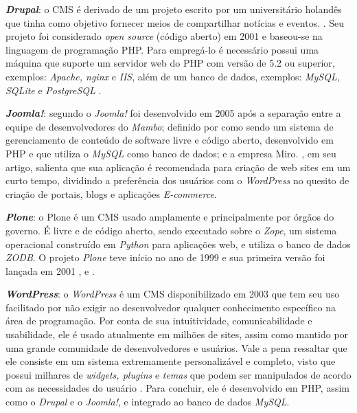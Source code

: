 \textbf{\textit{Drupal}}: o CMS é derivado de um projeto escrito por um universitário holandês que tinha como objetivo fornecer meios de compartilhar notícias e eventos. . Seu projeto foi considerado \textit{open source} (código aberto) em 2001 e baseou-se na linguagem de programação PHP. Para empregá-lo é necessário possui uma máquina que suporte um servidor web do PHP com versão de 5.2 ou superior, exemplos: \textit{Apache, nginx} e \textit{IIS}, além de um banco de dados, exemplos: \textit{MySQL, SQLite} e \textit{PostgreSQL} . 

\textbf{\textit{Joomla!}}: segundo  o \textit{Joomla!} foi desenvolvido em 2005 após a separação entre a equipe de desenvolvedores do \textit{Mambo}; definido por  como sendo um sistema de gerenciamento de conteúdo de software livre e código aberto, desenvolvido em PHP e que utiliza o \textit{MySQL} como banco de dados; e a empresa Miro. , em seu artigo, salienta que sua aplicação é recomendada para criação de web sites em um curto tempo, dividindo a preferência dos usuários com o \textit{WordPress} no quesito de criação de portais, blogs e aplicações \textit{E-commerce}.

\textbf{\textit{Plone}}: o Plone é um CMS usado amplamente e principalmente por órgãos do governo. É livre e de código aberto, sendo executado sobre o \textit{Zope}, um sistema operacional construído em \textit{Python} para aplicações web, e utiliza o banco de dados \textit{ZODB}. O projeto \textit{Plone} teve início no ano de 1999 e sua primeira versão foi lançada em 2001 ,  e .


\textbf{\textit{WordPress}}: o \textit{WordPress} é um CMS disponibilizado em 2003 que tem seu uso facilitado por não exigir ao desenvolvedor qualquer conhecimento específico na área de programação. Por conta de sua intuitividade, comunicabilidade e usabilidade, ele é usado atualmente em milhões de sites, assim como mantido por uma grande comunidade de desenvolvedores e usuários. Vale a pena ressaltar que ele consiste em um sistema extremamente personalizável e completo, visto que possui milhares de \textit{widgets, plugins} e \textit{temas} que podem ser manipulados de acordo com as necessidades do usuário . Para concluir, ele é desenvolvido em PHP, assim como o \textit{Drupal} e o \textit{Joomla!}, e integrado ao banco de dados \textit{MySQL}. 

